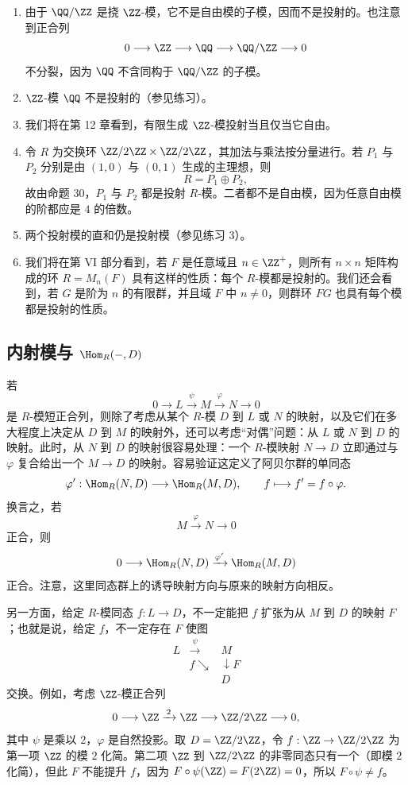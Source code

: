 \begin{enumerate}[label=(\arabic*)]
\item 由于 $\QQ/\ZZ$ 是挠 $\ZZ$-模，它不是自由模的子模，因而不是投射的。也注意到正合列
\[
0\longrightarrow\ZZ\longrightarrow\QQ\longrightarrow\QQ/\ZZ\longrightarrow0
\]
不分裂，因为 $\QQ$ 不含同构于 $\QQ/\ZZ$ 的子模。

\item $\ZZ$-模 $\QQ$ 不是投射的（参见练习）。

\item 我们将在第 12 章看到，有限生成 $\ZZ$-模投射当且仅当它自由。

\item 令 $R$ 为交换环 $\ZZ/2\ZZ\times\ZZ/2\ZZ$，其加法与乘法按分量进行。若 $P_1$ 与 $P_2$ 分别是由 $(1,0)$ 与 $(0,1)$ 生成的主理想，则
\[
R=P_1\oplus P_2,
\]
故由命题 30，$P_1$ 与 $P_2$ 都是投射 $R$-模。二者都不是自由模，因为任意自由模的阶都应是 $4$ 的倍数。

\item 两个投射模的直和仍是投射模（参见练习 3）。

\item 我们将在第 VI 部分看到，若 $F$ 是任意域且 $n\in\ZZ^+$，则所有 $n\times n$ 矩阵构成的环 $R=M_n(F)$ 具有这样的性质：每个 $R$-模都是投射的。我们还会看到，若 $G$ 是阶为 $n$ 的有限群，并且域 $F$ 中 $n\neq0$，则群环 $FG$ 也具有每个模都是投射的性质。
\end{enumerate}

\subsection*{内射模与 $\Hom_R(-,D)$}

若
\[
0\longrightarrow L\xrightarrow{\psi}M\xrightarrow{\varphi}N\longrightarrow0
\]
是 $R$-模短正合列，则除了考虑从某个 $R$-模 $D$ 到 $L$ 或 $N$ 的映射，以及它们在多大程度上决定从 $D$ 到 $M$ 的映射外，还可以考虑“对偶”问题：从 $L$ 或 $N$ 到 $D$ 的映射。此时，从 $N$ 到 $D$ 的映射很容易处理：一个 $R$-模映射 $N\to D$ 立即通过与 $\varphi$ 复合给出一个 $M\to D$ 的映射。容易验证这定义了阿贝尔群的单同态
\[
\varphi':\Hom_R(N,D)\longrightarrow\Hom_R(M,D),
\qquad f\longmapsto f'=f\circ\varphi.
\]
换言之，若
\[
M\xrightarrow{\varphi}N\longrightarrow0
\]
正合，则
\[
0\longrightarrow\Hom_R(N,D)\xrightarrow{\varphi'}\Hom_R(M,D)
\]
正合。注意，这里同态群上的诱导映射方向与原来的映射方向相反。

另一方面，给定 $R$-模同态 $f:L\to D$，不一定能把 $f$ 扩张为从 $M$ 到 $D$ 的映射 $F$；也就是说，给定 $f$，不一定存在 $F$ 使图
\[
\begin{array}{ccc}
L&\xrightarrow{\psi}&M\\
&f\searrow&\downarrow F\\[-1mm]
&&D
\end{array}
\]
交换。例如，考虑 $\ZZ$-模正合列
\[
0\longrightarrow\ZZ\xrightarrow{\,2\,}\ZZ\longrightarrow\ZZ/2\ZZ\longrightarrow0,
\]
其中 $\psi$ 是乘以 $2$，$\varphi$ 是自然投影。取 $D=\ZZ/2\ZZ$，令 $f:\ZZ\to\ZZ/2\ZZ$ 为第一项 $\ZZ$ 的模 $2$ 化简。第二项 $\ZZ$ 到 $\ZZ/2\ZZ$ 的非零同态只有一个（即模 $2$ 化简），但此 $F$ 不能提升 $f$，因为 $F\circ\psi(\ZZ)=F(2\ZZ)=0$，所以 $F\circ\psi\neq f$。

